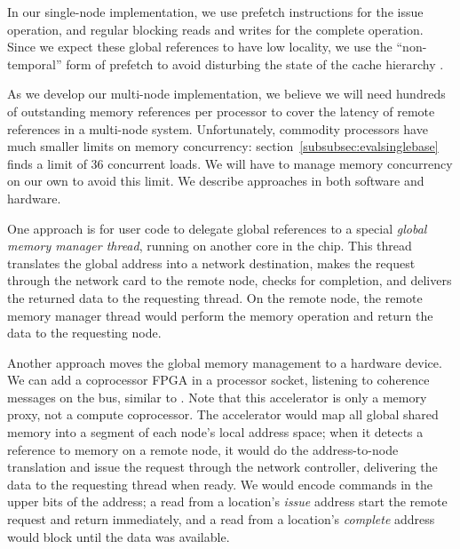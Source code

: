 \documentclass[10pt,nocopyrightspace,preprint]{sigplanconf}
\begin{document}
In our single-node implementation, we use prefetch instructions for the issue operation, and regular
blocking reads and writes for the complete operation.  Since we expect
these global references to have low locality, we use the
``non-temporal'' form of prefetch to avoid disturbing the state of the
cache hierarchy \cite{intel:swdev}.

As we develop our multi-node implementation, we believe we will need hundreds of outstanding memory references per
processor to cover the latency of remote references in a multi-node
system. Unfortunately, commodity processors have much smaller limits
on memory concurrency: section~\ref{subsubsec:evalsinglebase} finds a
limit of 36 concurrent loads. We will have to manage memory
concurrency on our own to avoid this limit. We describe approaches in
both software and hardware.

One approach is for user code to delegate global references to a
special {\em global memory manager thread}, running on another core in
the chip. This thread translates the global address into a network
destination, makes the request through the network card to the remote
node, checks for completion, and delivers the returned data to the
requesting thread. On the remote node, the remote memory manager
thread would perform the memory operation and return the data to the
requesting node.


Another approach moves the global memory management to a hardware
device. We can add a coprocessor FPGA in a processor socket, listening
to coherence messages on the bus, similar to \cite{mogill}. Note that
this accelerator is only a memory proxy, not a compute
coprocessor. The accelerator would map all global shared memory into a
segment of each node's local address space; when it detects a
reference to memory on a remote node, it would do the address-to-node
translation and issue the request through the network controller,
delivering the data to the requesting thread when ready. We would
encode commands in the upper bits of the address; a read from a
location's {\em issue} address start the remote request and return
immediately, and a read from a location's {\em complete} address would
block until the data was available.
\end{document}
